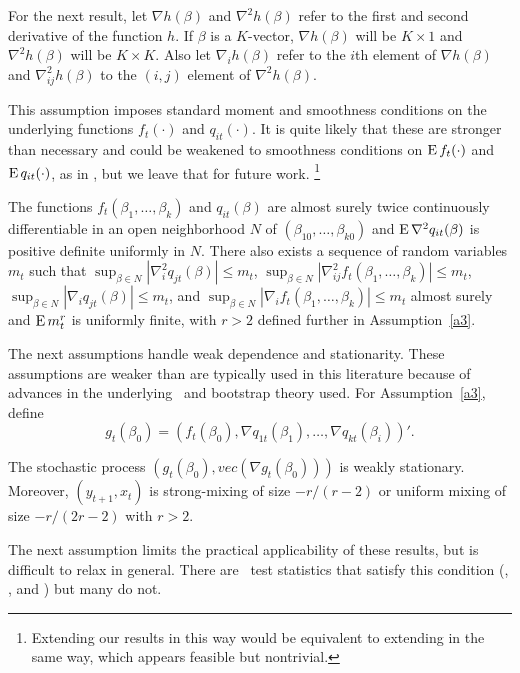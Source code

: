\documentclass[12pt,fleqn]{article}
\begin{document}
For the next result, let $\nabla h(\beta)$ and $\nabla^2 h(\beta)$
refer to the first and second derivative of the function $h$. If
$\beta$ is a $K$-vector, $\nabla h(\beta)$ will be $K \times 1$ and
$\nabla^2 h(\beta)$ will be $K \times K$. Also let $\nabla_i h(\beta)$
refer to the $i$th element of $\nabla h(\beta)$ and $\nabla_{ij}^2
h(\beta)$ to the $(i,j)$ element of $\nabla^2 h(\beta)$.

This assumption imposes standard moment and smoothness conditions on
the underlying functions $f_t(\cdot)$ and $q_{it}(\cdot)$. It is quite
likely that these are stronger than necessary and could be weakened to
smoothness conditions on $\operatorname{E} f_t(\cdot)$ and $\operatorname{E} q_{it}(\cdot)$, as in
\cite{Mcc:00}, but we leave that for future work.%
\footnote{Extending our results in this way would be equivalent to
  extending \cite{JoD:00} in the same way, which appears feasible but
  nontrivial.} %

\begin{asmp}\label{a2}
  The functions $f_t(\beta_1,\dots,\beta_k)$ and $q_{it}(\beta)$ are
  almost surely twice continuously differentiable in an open
  neighborhood $N$ of $(\beta_{10},\dots,\beta_{k0})$ and $\operatorname{E} \nabla^2
  q_{it}(\beta)$ is positive definite uniformly in $N$. There also
  exists a sequence of random variables $m_t$ such that
  $\sup_{\beta \in N} |\nabla_i^2 q_{jt}(\beta)| \leq m_t$,
  $\sup_{\beta \in N} |\nabla_{ij}^2 f_t(\beta_1,\dots,\beta_k)| \leq m_t$,
  $\sup_{\beta \in N} |\nabla_i q_{jt}(\beta)| \leq m_t$, and
  $\sup_{\beta \in N} |\nabla_i f_t(\beta_1,\dots,\beta_k)| \leq m_t$
  almost surely and $\operatorname{E} m_t^r$ is uniformly finite, with $r > 2$
  defined further in Assumption~\ref{a3}.
\end{asmp}

The next assumptions handle weak dependence and stationarity. These
assumptions are weaker than are typically used in this literature
because of advances in the underlying \clt\ and bootstrap theory used.
For Assumption~\ref{a3}, define
\[
  g_t(\beta_0) = (f_t(\beta_0), \nabla q_{1t}(\beta_1),\dots,\nabla q_{kt}(\beta_i))'.
\]

\begin{asmp}\label{a3}
  The stochastic process $(g_t(\beta_0), vec(\nabla g_t(\beta_0)))$ is
  weakly stationary. Moreover, $(y_{t+1},x_t)$ is strong-mixing of
  size $-r/(r-2)$ or uniform mixing of size $-r/(2r-2)$ with $r>2$.
\end{asmp}

The next assumption limits the practical applicability of these
results, but is difficult to relax in general. There are \oos\ test
statistics that satisfy this condition (\citealp{GiW:06},
\citealp{ClW:06,ClW:07}, and \citealp{Cal:16}) but many do not.
\end{document}
